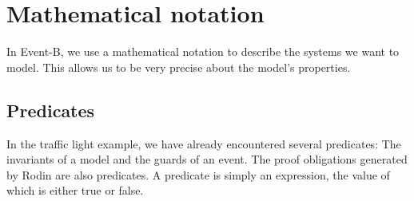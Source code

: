 \newcommand{\dascii}[1]{\textrm{ASCII: } \texttt{#1}}
\newcommand{\lascii}[1]{\qquad\quad \textrm{ASCII: } \texttt{#1}}
\newcommand{\inascii}[1]{(ASCII: \texttt{#1})}

\section{Mathematical notation}
\label{tut_mathematical_notation}
In Event-B, we use a mathematical notation to describe the systems we want to model.
This allows us to be very precise about the model's properties.

\subsection{Predicates}
\label{tut_predicates}
In the traffic light example, we have already encountered several predicates: The invariants of a model and the guards of an event. The proof obligations generated by Rodin are also predicates.  A predicate is simply an expression, the value of which is either true or false.

